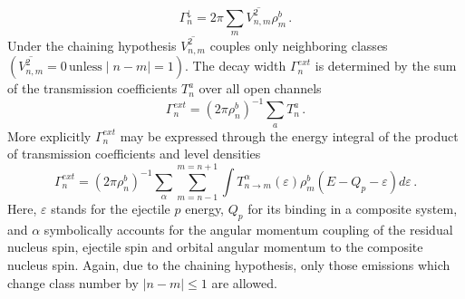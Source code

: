 \documentclass[twocolumn,amsmath,amssymb,10pt,groupedaddress,a4paper]{revtex4}
\begin{document}
\begin{equation}
\Gamma_{n}^{\downarrow}=2\pi\sum_{m}\overline{V_{n,m}^{2}}\rho_{m}^{b}\,.
\label{GdownMSC}
\end{equation}
Under the chaining hypothesis $\overline{V_{n,m}^{2}}$ couples only
neighboring classes $(\overline{V_{n,m}^{2}}=0\,{\textrm{unless}}\mid n-m\mid=1)$.
The decay width $\Gamma_{n}^{ext}$ is determined by the sum of the
transmission coefficients $T_{n}^{a}$ over all open channels
\begin{equation}
\Gamma_{n}^{ext}=(2\pi\rho_{n}^{b})^{-1}\sum_{a}T_{n}^{a}\,.
\end{equation}
More explicitly $\Gamma_{n}^{ext}$ may be expressed through the energy
integral of the product of transmission coefficients and level densities
\begin{equation}
\Gamma_{n}^{ext}=(2\pi\rho_{n}^{b})^{-1}\sum_{\alpha}\sum_{m=n-1}^{m=n+1}\int T_{n\rightarrow m}^{\alpha}(\varepsilon)\rho_{m}^{b}(E-Q_{p}-\varepsilon)d\varepsilon\,.
\label{Gammext}
\end{equation}
Here, $\varepsilon$ stands for the ejectile $p$ energy, $Q_{p}$
for its binding in a composite system, and $\alpha$ symbolically
accounts for the angular momentum coupling of the residual nucleus
spin, ejectile spin and orbital angular momentum to the composite
nucleus spin. Again, due to the chaining hypothesis, only those emissions
which change class number by $\mid n-m\mid\leq1$ are allowed.
\end{document}
